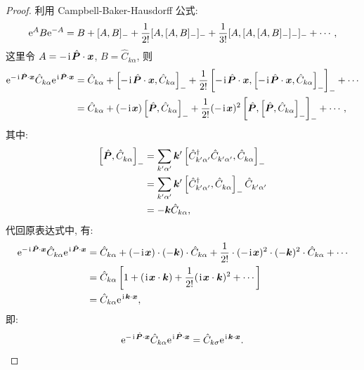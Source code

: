 \begin{proof}
利用 Campbell-Baker-Hausdorff 公式:
\begin{equation}
\e^A B \e^{-A}=B+[A, B]_-+\frac{1}{2 !}[A,[A, B]_-]_-+\frac{1}{3 !}[A,[A,[A, B]_-]_-]_-+\cdots ,
\end{equation}
这里令 $A=-\ii \hat{\vct{P}} \cdot \vct{x}$, $B=\hat{C}_{k \alpha}$,
则
\begin{align}
  \e^{-\ii \hat{\vct{P}} \cdot \vct{x}} \hat{C}_{k \alpha} \e^{\ii \hat{\vct{P}} \cdot \vct{x}}&=\hat{C}_{k \alpha}+\left[-\ii \hat{\vct{P}} \cdot \vct{x}, \hat{C}_{k \alpha}\right]_-+\frac{1}{2 !}\left[-\ii \hat{\vct{P}} \cdot \vct{x} ,\left[-\ii \hat{\vct{P}} \cdot \vct{x}, \hat{C}_{k \alpha}\right]_-\right]_-+\cdots \nonumber\\
& =\hat{C}_{k \alpha}+(-\ii \vct{x})\left[\hat{\vct{P}}, \hat{C}_{k \alpha}\right]_-+\frac{1}{2 !}(-\ii \vct{x})^2\left[\hat{\vct{P}},\left[\hat{\vct{P}}, \hat{C}_{k \alpha}\right]_-\right]_-+\cdots ,
\end{align}
其中:
\begin{align}
\left[\hat{\vct{P}}, \hat{C}^{}_{k \alpha}\right]_-&=\sum_{k^{\prime} \alpha^{\prime}} \vct{k}^\prime\left[\hat{C}_{k^{\prime} \alpha^{\prime}}^{\dagger} \hat{C}^{}_{k^{\prime} \alpha^{\prime}}, \hat{C}^{}_{k \alpha}\right]_- \nonumber\\
& =\sum_{k^\prime \alpha^{\prime}} \vct{k}^{\prime}\left[\hat{C}_{k^{\prime} \alpha^{\prime}}^{\dagger}, \hat{C}^{}_{k \alpha}\right]_- \hat{C}^{}_{k^{\prime} \alpha^{\prime}} \nonumber\\
& =-\vct{k} \hat{C}_{k \alpha},
\end{align}
代回原表达式中, 有:
\begin{align}
\e^{-\ii \hat{\vct{P}} \cdot \vct{x}} \hat{C}_{k \alpha} \e^{\ii \hat{\vct{P}} \cdot \vct{x}}&=\hat{C}_{k \alpha}+(-\ii \vct{x}) \cdot(-\vct{k}) \cdot \hat{C}_{k \alpha}+\frac{1}{2 !} \cdot(-\ii \vct{x})^2 \cdot(-\vct{k})^{2} \cdot \hat{C}_{k \alpha}+\cdots \nonumber\\
& =\hat{C}_{k \alpha}\left[1+(\ii \vct{x} \cdot \vct{k})+\frac{1}{2 !}(\ii \vct{x} \cdot \vct{k})^2+\cdots\right] \nonumber\\
& =\hat{C}_{k \alpha} \e^{\ii \vct{k} \cdot \vct{x}} ,
\end{align}
即:
\begin{equation}
\e^{-\ii \hat{\vct{P}} \cdot \vct{x}} \hat{C}_{k \alpha} \e^{\ii \hat{\vct{P}} \cdot \vct{x}}=\hat{C}_{k \sigma} \e^{\ii \vct{k} \cdot \vct{x}}.
\end{equation}
\end{proof}
